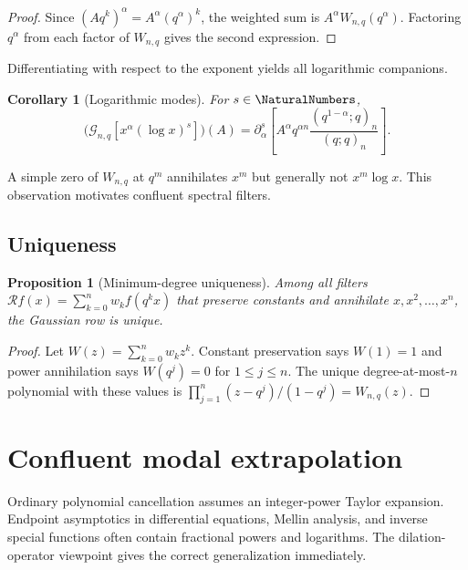 \documentclass[11pt,oneside]{article}
\numberwithin{equation}{section}
\newtheorem{proposition}[proposition]{Proposition}
\newtheorem{corollary}[corollary]{Corollary}
\theoremstyle{definition}
\theoremstyle{remark}
\newcommand{\Gc}{\mathcal G}
\newcommand{\Rc}{\mathcal R}
\begin{document}
\begin{proof}
Since $(Aq^k)^\alpha=A^\alpha(q^\alpha)^k$, the weighted sum is
$A^\alpha W_{n,q}(q^\alpha)$.  Factoring $q^\alpha$ from each factor of
$W_{n,q}$ gives the second expression.
\end{proof}

Differentiating with respect to the exponent yields all logarithmic companions.

\begin{corollary}[Logarithmic modes]
For $s\in\NaturalNumbers$,
\begin{equation}
 \bigl(\Gc_{n,q}[x^\alpha(\log x)^s]\bigr)(A)
 =\partial_\alpha^s
 \left[A^\alpha q^{\alpha n}
 \frac{(q^{1-\alpha};q)_n}{(q;q)_n}\right].
 \label{eq:log-power}
\end{equation}
\end{corollary}

A simple zero of $W_{n,q}$ at $q^m$ annihilates $x^m$ but generally not
$x^m\log x$.  This observation motivates confluent spectral filters.

\subsection{Uniqueness}

\begin{proposition}[Minimum-degree uniqueness]
Among all filters
$\Rc f(x)=\sum_{k=0}^nw_kf(q^kx)$ that preserve constants and annihilate
$x,x^2,\ldots,x^n$, the Gaussian row is unique.
\end{proposition}

\begin{proof}
Let $W(z)=\sum_{k=0}^nw_kz^k$.  Constant preservation says $W(1)=1$ and power
annihilation says $W(q^j)=0$ for $1\le j\le n$.  The unique degree-at-most-$n$
polynomial with these values is
$\prod_{j=1}^n(z-q^j)/(1-q^j)=W_{n,q}(z)$.
\end{proof}

\section{Confluent modal extrapolation}
\label{sec:modal}

Ordinary polynomial cancellation assumes an integer-power Taylor expansion.
Endpoint asymptotics in differential equations, Mellin analysis, and inverse
special functions often contain fractional powers and logarithms.  The
dilation-operator viewpoint gives the correct generalization immediately.
\end{document}

